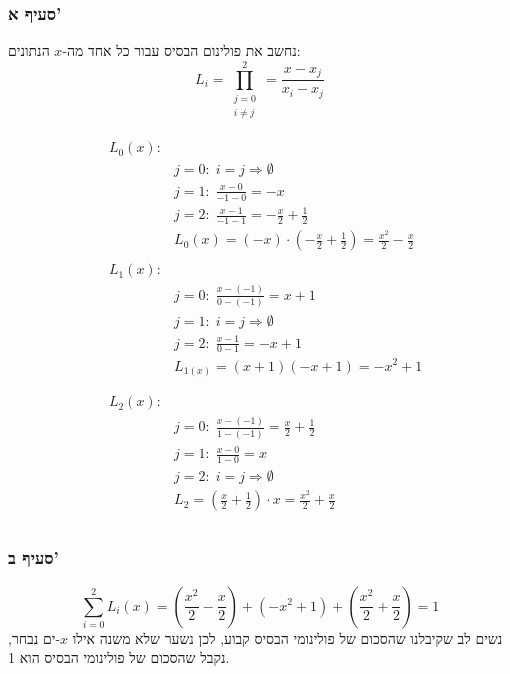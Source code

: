 \documentclass[
]{article}
\begin{document}
\subsubsection{סעיף א'}\label{ux5e1ux5e2ux5d9ux5e3-ux5d0-1}

נחשב את פולינום הבסיס עבור כל אחד מה-\(x\) הנתונים:
\[L _{i}=\prod_{\begin{array}{c}
j=0 \\
i\neq j
\end{array}}^{2}=\frac{x-x_{j}}{x_{i}-x_{j}}\]

\[\begin{aligned}
&\begin{aligned}
L_{0}(x):& \\
 & j=0:\; i=j\Longrightarrow \emptyset \\
 & j=1:\; \frac{x-0}{-1-0}=-x \\
 & j=2:\; \frac{x-1}{-1-1}=-\frac{x}{2}+\frac{1}{2} \\
&L_{0}(x)=(-x)\cdot \left(- \frac{x}{2}+\frac{1}{2} \right)=\frac{x^{2}}{2}-\frac{x}{2}
\end{aligned}\\
&\begin{aligned}
L_{1}(x):& \\
&j=0:\; \frac{x-(-1)}{0-(-1)}=x+1 \\
&j=1:\;i=j\Longrightarrow \emptyset \\
&j=2:\; \frac{x-1}{0-1}=-x+1 \\
&L _{1(x)}=(x+1)(-x+1)=-x^{2}+1
\end{aligned}\\
&\begin{aligned}\\
L_{2}(x): \\
& j=0:\;\frac{x-(-1)}{1-(-1)}=\frac{x}{2}+\frac{1}{2} \\
& j=1:\;\frac{x-0}{1-0}=x \\
& j=2:\;i=j\Longrightarrow \emptyset \\
&L _{2}=\left( \frac{x}{2}+\frac{1}{2} \right)\cdot x=\frac{x^{2}}{2}+\frac{x}{2}
\end{aligned}\\
\end{aligned}\]

\subsubsection{סעיף ב'}\label{ux5e1ux5e2ux5d9ux5e3-ux5d1-1}

\[\sum_{i=0}^{2}L _{i}(x)=\left( \frac{x^{2}}{2}-\frac{x}{2} \right)+(-x^{2}+1)+\left( \frac{x^{2}}{2}+\frac{x}{2} \right)=1\]
נשים לב שקיבלנו שהסכום של פולינומי הבסיס קבוע, לכן נשער שלא משנה אילו
\(x\)-ים נבחר, נקבל שהסכום של פולינומי הבסיס הוא 1.
\end{document}
